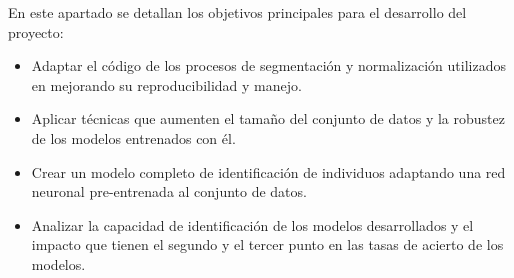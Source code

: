  \label{capitulo2}

En este apartado se detallan los objetivos principales para el desarrollo del proyecto:
\begin{itemize}
    \item Adaptar el código de los procesos de segmentación y normalización utilizados en \cite{tfg_iris_2020} mejorando su reproducibilidad y manejo.
    \item Aplicar técnicas que aumenten el tamaño del conjunto de datos y la robustez de los modelos entrenados con él.
    \item Crear un modelo completo de identificación de individuos adaptando una red neuronal pre-entrenada al conjunto de datos.
    \item Analizar la capacidad de identificación de los modelos desarrollados y el impacto que tienen el segundo y el tercer punto en las tasas de acierto de los modelos.                                                                                                                                                                                                           
\end{itemize}


